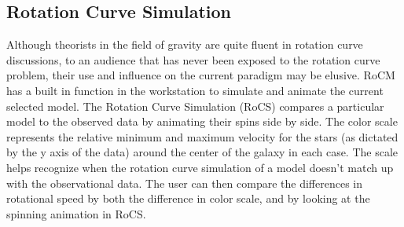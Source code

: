 \documentclass[conference]{IEEEtran-modified}
\providecommand{\e}[1]{\ensuremath{\times 10^{#1}}}
\begin{document}
%


\subsection{Rotation Curve Simulation}
Although theorists in the field of gravity are quite fluent in rotation curve discussions, to an audience that has never been exposed to the rotation curve problem, their use and influence on the current paradigm may be elusive. RoCM has a built in function in the workstation to simulate and animate the current selected model. The Rotation Curve Simulation (RoCS) compares a particular model to the observed data by animating their spins side by side. The color scale represents the relative {\color[HTML]{EA051C} minimum} and {\color[HTML]{1AAF3A} maximum} velocity for the stars (as dictated by the y axis of the data) around the center of the galaxy in each case. The scale helps recognize when the rotation curve simulation of a model doesn't match up with the observational data.  The user can then compare the differences in rotational speed by both the difference in color scale, and by looking at the spinning animation in RoCS.
\end{document}
